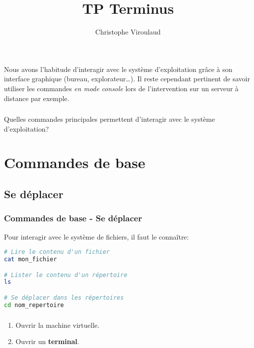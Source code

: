 \documentclass[svgnames,11pt]{beamer}
\author[]{Christophe Viroulaud}
\title{TP Terminus}
\date{\framebox{\textbf{ArchMat 10}}}
\institute{Première - NSI}
\begin{document}
\begin{frame}
\titlepage
\end{frame}
\begin{frame}
    \frametitle{}

    Nous avons l'habitude d'interagir avec le système d'exploitation grâce à son interface graphique (bureau, explorateur\dots). Il reste cependant pertinent de savoir utiliser les commandes \emph{en mode console} lors de l'intervention sur un serveur à distance par exemple.

\end{frame}
\begin{frame}
    \frametitle{}

    \begin{framed}
        \centering Quelles commandes principales permettent d'interagir avec le système d'exploitation?
    \end{framed}

\end{frame}
\section{Commandes de base}
\subsection{Se déplacer}
\begin{frame}[fragile]
    \frametitle{Commandes de base - Se déplacer}

    Pour interagir avec le système de fichiers, il faut le connaître:
\begin{center}
\begin{lstlisting}[language=Bash , basicstyle=\ttfamily\small, xleftmargin=1em, xrightmargin=1em]
# Lire le contenu d'un fichier
cat mon_fichier

# Lister le contenu d'un répertoire
ls

# Se déplacer dans les répertoires
cd nom_repertoire
\end{lstlisting}
\end{center}

\end{frame}
\begin{frame}
    \frametitle{}

    \begin{activite}
    \begin{enumerate}
        \item Ouvrir la machine virtuelle.
        \item Ouvrir un \textbf{terminal}.
    \end{enumerate}
    \end{activite}

\end{frame}
\end{document}

